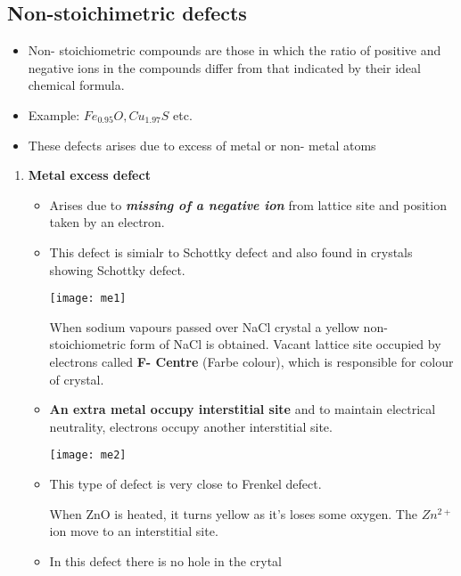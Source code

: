 \subsection{Non-stoichimetric defects}
\begin{itemize}
	\item Non- stoichiometric compounds are those in which the ratio of positive and negative ions in the compounds differ from that indicated by their ideal chemical formula.
	\item Example: $Fe_{0.95}O, Cu_{1.97}S$ etc.
	\item These defects arises due to excess of metal or non- metal atoms
\end{itemize}
\begin{enumerate}
	\item \textbf{Metal excess defect}
	\begin{itemize}
		\item Arises due to \textbf{\textit{missing of a negative ion}} from lattice site and position taken by an electron.
		\item This defect is simialr to Schottky defect and also found in crystals showing Schottky defect.\\
		\begin{minipage}{0.95\textwidth}
			\centering
			\texttt{[image: me1]}
		\end{minipage}
		\begin{example}
			When sodium vapours passed over NaCl crystal a yellow non- stoichiometric form of NaCl is obtained. Vacant lattice site occupied by electrons called \textbf{F- Centre} (Farbe colour), which is responsible for colour of crystal.
		\end{example}
		\item \textbf{An extra metal occupy interstitial site} and to maintain electrical neutrality, electrons occupy another interstitial site.\\
		\begin{minipage}{0.95\textwidth}
			\centering
			\texttt{[image: me2]}
		\end{minipage}
		\item This type of defect is very close to Frenkel defect.
		\begin{example}
			When ZnO is heated, it turns yellow as it's loses some oxygen. The $Zn^{2+}$ ion move to an interstitial site.
		\end{example}
		\item In this defect there is no hole in the crytal

\end{itemize}
\end{enumerate}
